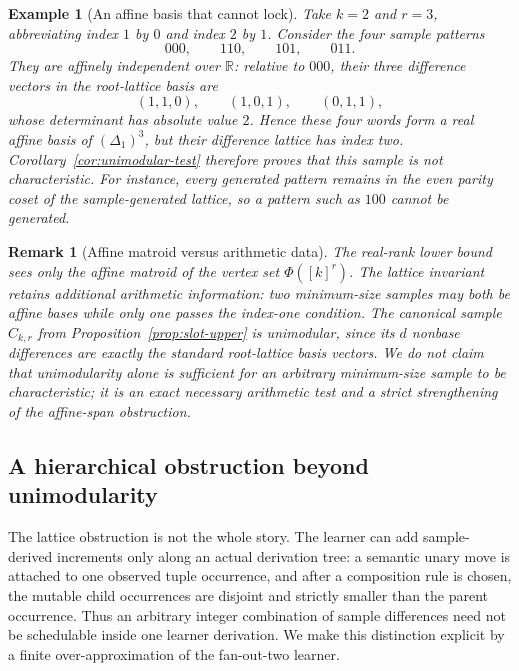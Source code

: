 \documentclass[11pt]{article}
\newtheorem{remark}[definition]{Remark}
\newtheorem{example}[definition]{Example}
\begin{document}
\begin{example}[An affine basis that cannot lock]
\label{ex:index-two-affine-basis}
Take $k=2$ and $r=3$, abbreviating index $1$ by $0$ and index $2$ by $1$.
Consider the four sample patterns
\[
 000,\qquad 110,\qquad 101,\qquad 011.
\]
They are affinely independent over $\mathbb R$: relative to $000$, their
three difference vectors in the root-lattice basis are
\[
 (1,1,0),\qquad(1,0,1),\qquad(0,1,1),
\]
whose determinant has absolute value $2$.  Hence these four words form a real
affine basis of $(\Delta_1)^3$, but their difference lattice has index two.
Corollary~\ref{cor:unimodular-test} therefore proves that this sample is not
characteristic.  For instance, every generated pattern remains in the even
parity coset of the sample-generated lattice, so a pattern such as $100$ cannot
be generated.
\end{example}

\begin{remark}[Affine matroid versus arithmetic data]
The real-rank lower bound sees only the affine matroid of the vertex set
$\Phi([k]^r)$.  The lattice invariant retains additional arithmetic
information: two minimum-size samples may both be affine bases while only one
passes the index-one condition.  The canonical sample $C_{k,r}$ from
Proposition~\ref{prop:slot-upper} is unimodular, since its $d$ nonbase
differences are exactly the standard root-lattice basis vectors.  We do not
claim that unimodularity alone is sufficient for an arbitrary minimum-size
sample to be characteristic; it is an exact necessary arithmetic test and a
strict strengthening of the affine-span obstruction.
\end{remark}


\subsection{A hierarchical obstruction beyond unimodularity}
\label{subsec:hierarchical-envelope}

The lattice obstruction is not the whole story.  The learner can add
sample-derived increments only along an actual derivation tree: a semantic
unary move is attached to one observed tuple occurrence, and after a
composition rule is chosen, the mutable child occurrences are disjoint and
strictly smaller than the parent occurrence.  Thus an arbitrary integer
combination of sample differences need not be schedulable inside one learner
derivation.  We make this distinction explicit by a finite over-approximation
of the fan-out-two learner.
\end{document}

